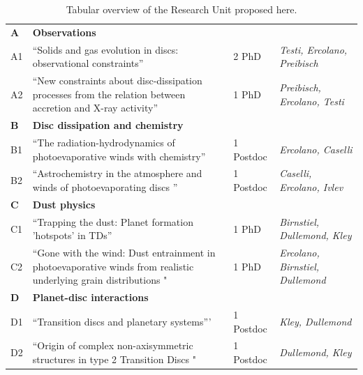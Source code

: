 \documentclass[10pt,fleqn,twoside]{article}
\newcommand{\AreacolA}{\color{blue}}
\newcommand{\AreacolB}{\color{Green}}
\newcommand{\AreacolC}{\color{YellowOrange}}
\newcommand{\AreacolD}{\color{Red}}
\begin{document}
\begin{table}
\noindent
\begin{tabular}{p{1cm}p{8cm}p{2.0cm}p{3.9cm}}
\hline
{\bf\AreacolA A} & {\bf\AreacolA Observations} & & \\ 
A1 & ``Solids and gas evolution in discs: observational constraints'' & 2 PhD & {\em Testi, Ercolano, Preibisch}\\
A2 & ``New constraints about disc-dissipation processes from the relation between accretion and X-ray activity'' & 1 PhD & {\em Preibisch, Ercolano, Testi}\\
\hline
{\bf\AreacolB B} & {\bf\AreacolB Disc dissipation and chemistry} & & \\ 
B1 & ``The radiation-hydrodynamics of photoevaporative winds with chemistry'' & 1 Postdoc & {\em Ercolano, Caselli}\\
B2 & ``Astrochemistry in the atmosphere and winds of photoevaporating discs '' & 1 Postdoc & {\em
                                                              Caselli,
                                                              Ercolano,
                                                              Ivlev}\\
\hline
{\bf\AreacolC C} & {\bf\AreacolC Dust physics} & & \\ 
C1 & ``Trapping the dust: Planet formation 'hotspots' in TDs'' & 1 PhD
                               & {\em Birnstiel, Dullemond, Kley}\\
C2 & ``Gone with the wind: Dust entrainment in photoevaporative winds
     from realistic underlying grain distributions "& 1 PhD & {\em
                                                              Ercolano,
                                                              Birnstiel,
                                                              Dullemond}\\
\hline
{\bf\AreacolD D} & {\bf\AreacolD Planet-disc interactions} & & \\ 
D1 & ``Transition discs and planetary systems''' & 1 Postdoc & {\em Kley, Dullemond}\\
D2 & ``Origin of complex non-axisymmetric structures in type 2
     Transition Discs "& 1 Postdoc & {\em Dullemond, Kley}\\
\hline
\end{tabular}
\caption{\label{table-overview-ru}
Tabular overview of the Research Unit proposed here.}
\end{table}
\end{document}
